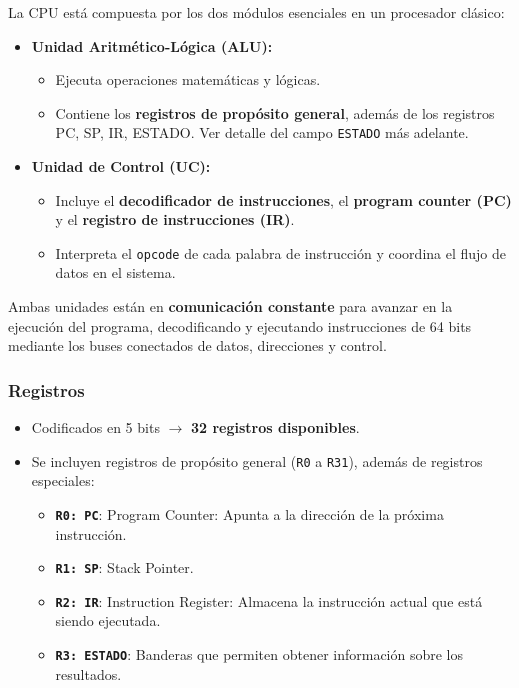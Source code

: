 \documentclass{article}
\begin{document}
La CPU está compuesta por los dos módulos esenciales en un procesador clásico:

\begin{itemize}
    \item \textbf{Unidad Aritmético-Lógica (ALU):}
    \begin{itemize}
        \item Ejecuta operaciones matemáticas y lógicas.
        \item Contiene los \textbf{registros de propósito general}, además de los registros PC, SP, IR, ESTADO. Ver detalle del campo \texttt{ESTADO} más adelante.
    \end{itemize}
    \item \textbf{Unidad de Control (UC):}
    \begin{itemize}
        \item Incluye el \textbf{decodificador de instrucciones}, el \textbf{program counter (PC)} y el \textbf{registro de instrucciones (IR)}.
        \item Interpreta el \texttt{opcode} de cada palabra de instrucción y coordina el flujo de datos en el sistema.
    \end{itemize}
\end{itemize}

Ambas unidades están en \textbf{comunicación constante} para avanzar en la ejecución del programa, decodificando y ejecutando instrucciones de 64 bits mediante los buses conectados de datos, direcciones y control.

\subsubsection{Registros}

\begin{itemize}
    \item Codificados en 5 bits $\rightarrow$ \textbf{32 registros disponibles}.
    \item Se incluyen registros de propósito general (\texttt{R0} a \texttt{R31}), además de registros especiales:
    \begin{itemize}
        \item \textbf{\texttt{R0: PC}}: Program Counter: Apunta a la dirección de la próxima instrucción.
        \item \textbf{\texttt{R1: SP}}: Stack Pointer.
        \item \textbf{\texttt{R2: IR}}: Instruction Register: Almacena la instrucción actual que está siendo ejecutada.
        \item \textbf{\texttt{R3: ESTADO}}: Banderas que permiten obtener información sobre los resultados.
    \end{itemize}
\end{itemize}
\end{document}
